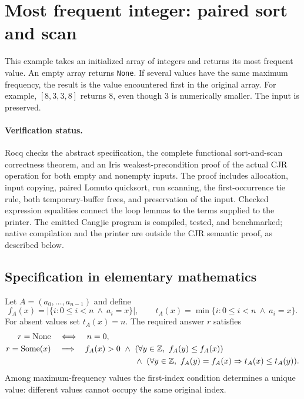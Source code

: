 \section{Most frequent integer: paired sort and scan}
\label{sec:most-frequent}

This example takes an initialized array of integers and returns its most
frequent value. An empty array returns \texttt{None}. If several values
have the same maximum frequency, the result is the value encountered first
in the original array. For example, $[8,3,3,8]$ returns $8$, even though
$3$ is numerically smaller. The input is preserved.

\paragraph{Verification status.}
Rocq checks the abstract specification, the complete functional
sort-and-scan correctness theorem, and an Iris weakest-precondition proof
of the actual CJR operation for both empty and nonempty inputs.
The proof includes allocation, input copying, paired Lomuto quicksort,
run scanning, the first-occurrence tie rule, both temporary-buffer frees,
and preservation of the input. Checked expression equalities connect the
loop lemmas to the terms supplied to the printer. The emitted Cangjie
program is compiled, tested, and benchmarked; native compilation and the
printer are outside the CJR semantic proof, as described below.

\subsection{Specification in elementary mathematics}

Let $A=(a_0,\ldots,a_{n-1})$ and define
\[
 f_A(x)=\bigl|\{i:0\leq i<n\ \land\ a_i=x\}\bigr|,
 \qquad
 t_A(x)=\min\{i:0\leq i<n\ \land\ a_i=x\}.
\]
For absent values set $t_A(x)=n$. The required answer $r$ satisfies
\[
\begin{aligned}
 r=\mathrm{None}&\quad\Longleftrightarrow\quad n=0,\\
 r=\mathrm{Some}(x)&\quad\Longrightarrow\quad
 f_A(x)>0\ \land\ (\forall y\in\mathbb Z,\ f_A(y)\leq f_A(x))\\
 &\hspace{36mm}\land\
 (\forall y\in\mathbb Z,\ f_A(y)=f_A(x)\Rightarrow t_A(x)\leq t_A(y)).
\end{aligned}
\]
Among maximum-frequency values the first-index condition determines a
unique value: different values cannot occupy the same original index.

